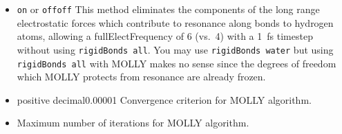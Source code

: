 \begin{itemize}
\item
{}
{{\tt on} or {\tt off}}{{\tt off}}
{
This method eliminates the components of the long range electrostatic
forces which contribute to resonance along bonds to hydrogen atoms,
allowing a fullElectFrequency of 6 (vs.\ 4) with a 1~fs timestep
without using {\tt rigidBonds all}.  You may use {\tt rigidBonds water} but
using {\tt rigidBonds all} with MOLLY makes no sense since the degrees of
freedom which MOLLY protects from resonance are already frozen.
}

\item
{}
{positive decimal}{0.00001}
{
Convergence criterion for MOLLY algorithm.
}

\item
{}
{
Maximum number of iterations for MOLLY algorithm.
}

\end{itemize}

